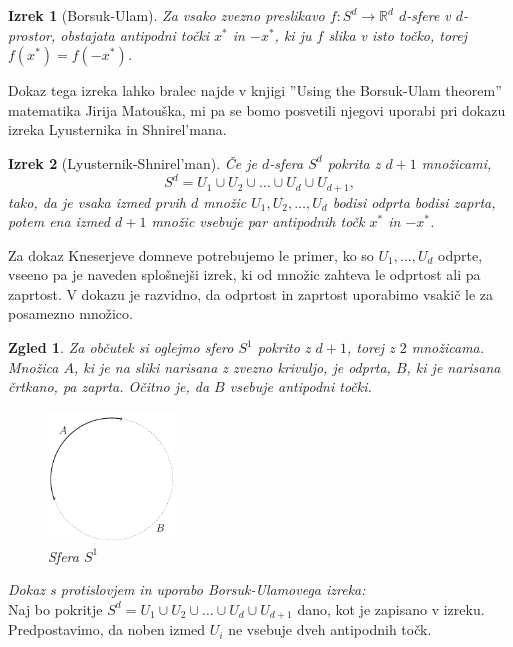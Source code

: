 \documentclass[a4paper,12pt]{article}
\newtheorem{izrek}{Izrek}
\newtheorem{zgled}{Zgled}
\begin{document}
\begin{izrek}[Borsuk-Ulam]
Za vsako zvezno preslikavo $f:S^d \rightarrow \mathbb{R}^d$ $d$-sfere v $d$-prostor, obstajata antipodni točki $x^*$ in $-x^*$, ki ju $f$ slika v isto točko, torej $f(x^*)=f(-x^*)$.
\end{izrek}

Dokaz tega izreka lahko bralec najde v knjigi ''Using the Borsuk-Ulam theorem'' matematika Jirija Matouška, mi pa se bomo posvetili njegovi uporabi pri dokazu izreka Lyusternika in Shnirel'mana.

\begin{izrek}[Lyusternik-Shnirel'man]
Če je $d$-sfera $S^d$ pokrita z $d+1$ množicami,
$$S^d = U_1 \cup U_2 \cup \ldots \cup U_d \cup U_{d+1},$$
tako, da je vsaka izmed prvih $d$ množic $U_1, U_2, \ldots, U_d$ bodisi odprta bodisi zaprta, potem ena izmed $d+1$ množic vsebuje par antipodnih točk $x^*$ in $-x^*$.
\end{izrek}

Za dokaz Kneserjeve domneve potrebujemo le primer, ko so $U_1, \ldots, U_d$ odprte, vseeno pa je naveden splošnejši izrek, ki od množic zahteva le odprtost ali pa zaprtost. V dokazu je razvidno, da odprtost in zaprtost uporabimo vsakič le za posamezno množico.

\newpage
\begin{zgled}{Za občutek si oglejmo sfero $S^1$ pokrito z $d+1$, torej z $2$ množicama. Množica $A$, ki je na sliki narisana z zvezno krivuljo, je odprta, $B$, ki je narisana črtkano, pa zaprta. Očitno je, da $B$ vsebuje antipodni točki. 
\begin{figure}[h!]
\centering
\includegraphics[width=0.3\textwidth]{sfera_s1}
\caption{Sfera $S^1$}
\end{figure}
}
\end{zgled}


\noindent
{\em Dokaz s protislovjem in uporabo Borsuk-Ulamovega izreka:} \\
\indent Naj bo pokritje $S^d = U_1 \cup U_2 \cup \ldots \cup U_d \cup U_{d+1}$ dano, kot je zapisano v izreku. Predpostavimo, da noben izmed $U_i$ ne vsebuje dveh antipodnih točk. 
\end{document}

